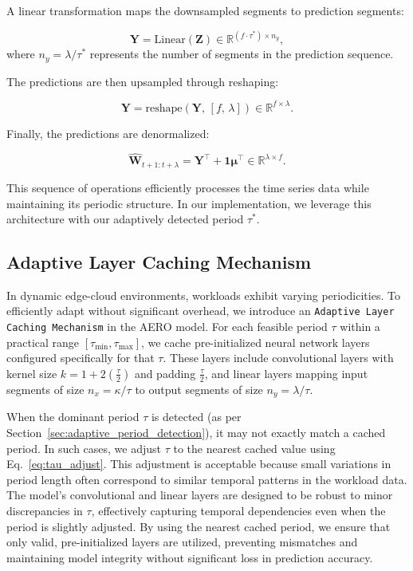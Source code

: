 \documentclass{ieeetmlcn}
\begin{document}
A linear transformation maps the downsampled segments to prediction segments:

\begin{equation}
\label{eq:linear_mapping}
\mathbf{Y} = \text{Linear}\left( \mathbf{Z} \right) \in \mathbb{R}^{(f \cdot \tau^{\ast}) \times n_y},
\end{equation}
where $n_y = \lambda / \tau^{\ast}$ represents the number of segments in the prediction sequence.

The predictions are then upsampled through reshaping:

\begin{equation}
\label{eq:upsampling}
\mathbf{Y} = \text{reshape}\left( \mathbf{Y},\, \left[ f,\, \lambda \right] \right) \in \mathbb{R}^{f \times \lambda}.
\end{equation}

Finally, the predictions are denormalized:

\begin{equation}
\label{eq:denormalization}
\hat{\mathbf{W}}_{t+1:t+\lambda} = \mathbf{Y}^\top + \mathbf{1} \boldsymbol{\mu}^\top \in \mathbb{R}^{\lambda \times f}.
\end{equation}

This sequence of operations efficiently processes the time series data while maintaining its periodic structure. In our implementation, we leverage this architecture with our adaptively detected period $\tau^{\ast}$.


\subsection{Adaptive Layer Caching Mechanism}
\label{sec:adaptive_layer_caching}

{\color{blue}
In dynamic edge-cloud environments, workloads exhibit varying periodicities. To efficiently adapt without significant overhead, we introduce an \texttt{Adaptive Layer Caching Mechanism} in the AERO model. For each feasible period $\tau$ within a practical range $[\tau_{\min}, \tau_{\max}]$, we cache pre-initialized neural network layers configured specifically for that $\tau$. These layers include convolutional layers with kernel size $k = 1 + 2\left( \frac{\tau}{2} \right)$ and padding $\frac{\tau}{2}$, and linear layers mapping input segments of size $n_x = \kappa / \tau$ to output segments of size $n_y = \lambda / \tau$.

When the dominant period $\tau$ is detected (as per Section~\ref{sec:adaptive_period_detection}), it may not exactly match a cached period. In such cases, we adjust $\tau$ to the nearest cached value using Eq.~\eqref{eq:tau_adjust}. This adjustment is acceptable because small variations in period length often correspond to similar temporal patterns in the workload data. The model's convolutional and linear layers are designed to be robust to minor discrepancies in $\tau$, effectively capturing temporal dependencies even when the period is slightly adjusted. By using the nearest cached period, we ensure that only valid, pre-initialized layers are utilized, preventing mismatches and maintaining model integrity without significant loss in prediction accuracy.
}
\end{document}
